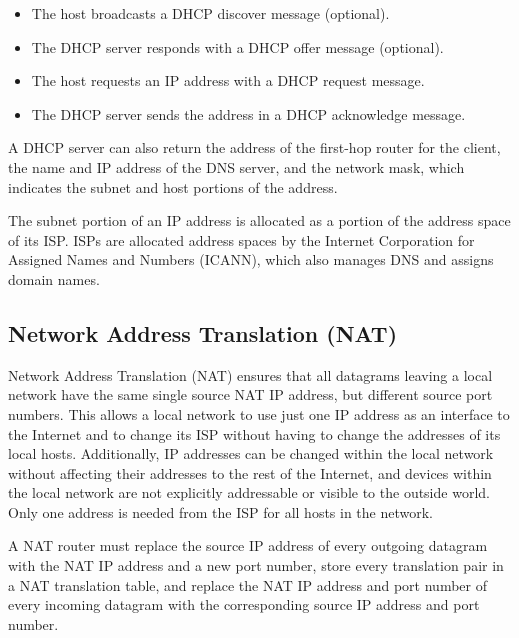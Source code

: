 \begin{itemize}
  \item The host broadcasts a DHCP discover message (optional).
  \item The DHCP server responds with a DHCP offer message (optional).
  \item The host requests an IP address with a DHCP request message.
  \item The DHCP server sends the address in a DHCP acknowledge message.
\end{itemize}

A DHCP server can also return the address of the first-hop router for the client, the name and IP address of the DNS server, and the network mask, which indicates the subnet and host portions of the address.

The subnet portion of an IP address is allocated as a portion of the address space of its ISP\@.
ISPs are allocated address spaces by the Internet Corporation for Assigned Names and Numbers (ICANN), which also manages DNS and assigns domain names.

\subsection{Network Address Translation (NAT)}

Network Address Translation (NAT) ensures that all datagrams leaving a local network have the same single source NAT IP address, but different source port numbers.
This allows a local network to use just one IP address as an interface to the Internet and to change its ISP without having to change the addresses of its local hosts.
Additionally, IP addresses can be changed within the local network without affecting their addresses to the rest of the Internet, and devices within the local network are not explicitly addressable or visible to the outside world.
Only one address is needed from the ISP for all hosts in the network.

A NAT router must replace the source IP address of every outgoing datagram with the NAT IP address and a new port number, store every translation pair in a NAT translation table, and replace the NAT IP address and port number of every incoming datagram with the corresponding source IP address and port number.

